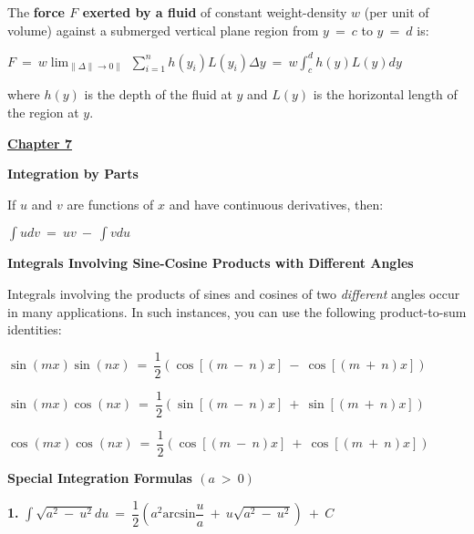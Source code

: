 \documentclass{article}
\begin{document}
\begin{large}
\hspace{0.1in} The \textbf{force $F$ exerted by a fluid} of constant weight-density $w$ (per unit of volume) against a submerged vertical plane region from $y\ =\ c$ to $y\ =\ d$ is:

\hspace{1.5in} $F\ =\ w\displaystyle\lim_{\|\Delta\|\rightarrow 0\|}\ \displaystyle\sum^{n}_{i=1}h(y_{i})L(y_{i})\Delta y\ =\ w\displaystyle\int^{d}_{c}h(y)L(y)dy$

\hspace{0.1in} where $h(y)$ is the depth of the fluid at $y$ and $L(y)$ is the horizontal length of the region at $y$.

\vspace{0.25in}

\underline{\textbf{\huge Chapter 7 \phantom{ } \phantom{ } \phantom{ } \phantom{ }}}

\textbf{Integration by Parts}

\hspace{0.1in} If $u$ and $v$ are functions of $x$ and have continuous derivatives, then:

\hspace{1.5in} $\displaystyle\int u dv\ =\ uv\ -\ \displaystyle\int v du$

\textbf{Integrals Involving Sine-Cosine Products with Different Angles}

\hspace{0.1in} Integrals involving the products of sines and cosines of two \textit{different} angles occur in many applications.  In such instances, you can use the following product-to-sum identities:

\hspace{1.0in} $\sin (mx)\sin (nx)\ =\ \dfrac{1}{2}(\cos [(m\ -\ n)x]\ -\ \cos [(m\ +\ n)x])$

\hspace{1.0in} $\sin (mx)\cos (nx)\ =\ \dfrac{1}{2}(\sin [(m\ -\ n)x]\ +\ \sin [(m\ +\ n)x])$

\hspace{1.0in} $\cos (mx)\cos (nx)\ =\ \dfrac{1}{2}(\cos [(m\ -\ n)x]\ +\ \cos [(m\ +\ n)x])$

\vspace{0.5in}
\textbf{Special Integration Formulas $(a\ >\ 0)$}

\hspace{0.1in} \textbf{1.} $\displaystyle\int\sqrt{a^{2}\ -\ u^{2}}du\ =\ \dfrac{1}{2}\left(a^{2}\text{arcsin}\dfrac{u}{a}\ +\ u\sqrt{a^{2}\ -\ u^{2}}\right)\ +\ C$


\end{large}
\end{document}

